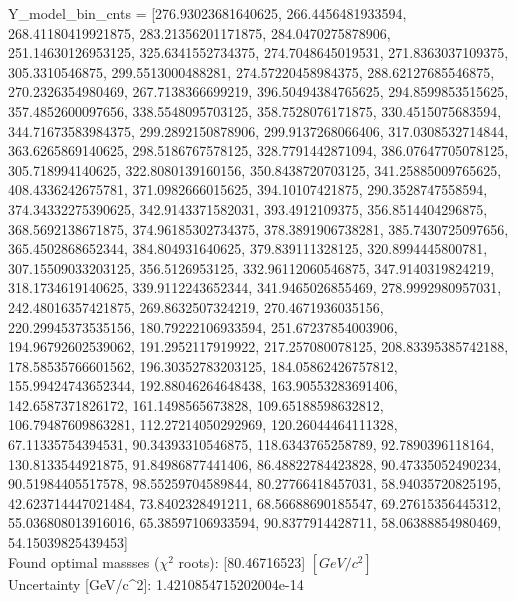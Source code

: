 \documentclass[12pt]{article}
\begin{document}
	Y\_model\_bin\_cnts = [276.93023681640625, 266.4456481933594, 268.41180419921875, 283.21356201171875, 284.0470275878906, 251.14630126953125, 325.6341552734375, 274.7048645019531, 271.8363037109375, 305.3310546875, 299.5513000488281, 274.57220458984375, 288.62127685546875, 270.2326354980469, 267.7138366699219, 396.50494384765625, 294.8599853515625, 357.4852600097656, 338.5548095703125, 358.7528076171875, 330.4515075683594, 344.71673583984375, 299.2892150878906, 299.9137268066406, 317.0308532714844, 363.6265869140625, 298.5186767578125, 328.7791442871094, 386.07647705078125, 305.718994140625, 322.8080139160156, 350.8438720703125, 341.25885009765625, 408.4336242675781, 371.0982666015625, 394.10107421875, 290.3528747558594, 374.34332275390625, 342.9143371582031, 393.4912109375, 356.8514404296875, 368.5692138671875, 374.96185302734375, 378.3891906738281, 385.7430725097656, 365.4502868652344, 384.804931640625, 379.839111328125, 320.8994445800781, 307.15509033203125, 356.5126953125, 332.96112060546875, 347.9140319824219, 318.1734619140625, 339.9112243652344, 341.9465026855469, 278.9992980957031, 242.48016357421875, 269.8632507324219, 270.4671936035156, 220.29945373535156, 180.79222106933594, 251.67237854003906, 194.96792602539062, 191.2952117919922, 217.257080078125, 208.83395385742188, 178.58535766601562, 196.30352783203125, 184.05862426757812, 155.99424743652344, 192.88046264648438, 163.90553283691406, 142.6587371826172, 161.1498565673828, 109.65188598632812, 106.79487609863281, 112.27214050292969, 120.26044464111328, 67.11335754394531, 90.34393310546875, 118.6343765258789, 92.7890396118164, 130.8133544921875, 91.84986877441406, 86.48822784423828, 90.47335052490234, 90.51984405517578, 98.55259704589844, 80.27766418457031, 58.94035720825195, 42.623714447021484, 73.8402328491211, 68.56688690185547, 69.27615356445312, 55.036808013916016, 65.38597106933594, 90.8377914428711, 58.06388854980469, 54.15039825439453]\\

    Found optimal massses ($\chi^2$ roots): [80.46716523] $[GeV/c^{2}]$\\
    Uncertainty [GeV/c^2]: 1.4210854715202004e-14\\
\end{document}
